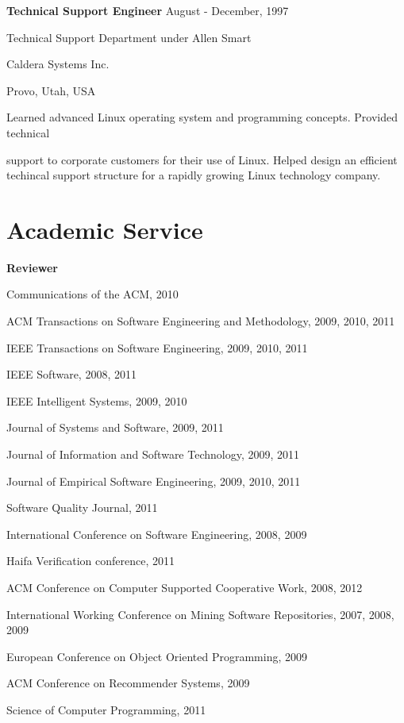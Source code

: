 \documentclass[margin,line,article,letterpaper]{res}
\newenvironment{list1}{
  \begin{list}{}{%
      \setlength{\itemsep}{0in}
      \setlength{\parsep}{0in} \setlength{\parskip}{0in}
      \setlength{\topsep}{0in} \setlength{\partopsep}{0in} 
      \setlength{\leftmargin}{0.17in}}}{\end{list}}
\newcommand{\timespan}[1]{#1}
\begin{document}
\begin{resume}
\textbf{Technical Support Engineer} \hfill \timespan{August - December, 1997}\\
\vspace{-10pt}
\begin{list1}
\item Technical Support Department under Allen Smart
\item Caldera Systems Inc.
\item Provo, Utah, USA
\vspace{6pt}
\item Learned advanced Linux operating system and programming concepts. Provided technical

support to corporate customers for their use of Linux. Helped design an efficient 
techincal support structure for a rapidly growing Linux technology company.
\end{list1}


\section{Academic \hspace{.2in} Service}
\textbf{Reviewer}
\begin{list1}
\item Communications of the ACM, 2010
\item ACM Transactions on Software Engineering and Methodology, 2009, 2010, 2011
\item IEEE Transactions on Software Engineering, 2009, 2010, 2011
\item IEEE Software, 2008, 2011
\item IEEE Intelligent Systems, 2009, 2010
\item Journal of Systems and Software, 2009, 2011
\item Journal of Information and Software Technology, 2009, 2011
\item Journal of Empirical Software Engineering, 2009, 2010, 2011
\item Software Quality Journal, 2011
\item International Conference on Software Engineering, 2008, 2009
\item Haifa Verification conference, 2011
\item ACM Conference on Computer Supported Cooperative Work, 2008, 2012
\item International Working Conference on Mining Software Repositories, 2007, 2008, 2009
\item European Conference on Object Oriented Programming, 2009
\item ACM Conference on Recommender Systems, 2009
\item Science of Computer Programming, 2011
\end{list1}


\end{resume}
\end{document}

